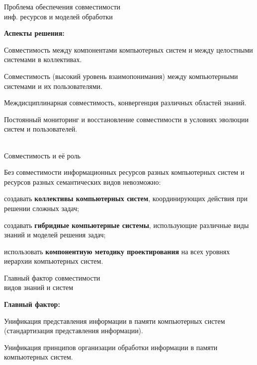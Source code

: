 \begin{frame}{Проблема обеспечения совместимости\\инф. ресурсов и моделей обработки}
	\topline
	\justifying
	
	\textbf{Аспекты решения:}
	\begin{textitemize}
		\item Совместимость между компонентами компьютерных систем и между целостными системами в коллективах.
		\item Совместимость (высокий уровень взаимопонимания) между компьютерными системами и их пользователями.
		\item Междисциплинарная совместимость, конвергенция различных областей знаний.
		\item Постоянный мониторинг и восстановление совместимости в условиях эволюции систем и пользователей.
	\end{textitemize}
	
\end{frame}


\begin{frame}{\\Совместимость и её роль}
	\topline
	\justifying
	
	Без совместимости информационных ресурсов разных компьютерных систем и ресурсов разных семантических видов невозможно:
	\begin{textitemize}
		\item создавать \textbf{коллективы компьютерных систем}, координирующих действия при решении сложных задач;
		\item создавать \textbf{гибридные компьютерные системы}, использующие различные виды знаний и моделей решения задач;
		\item использовать \textbf{компонентную методику проектирования} на всех уровнях иерархии компьютерных систем.
	\end{textitemize}
	
\end{frame}


\begin{frame}{Главный фактор совместимости\\видов знаний и систем}
	\topline
	\justifying
	
	\textbf{Главный фактор:}
	\begin{textitemize}
		\item Унификация представления информации в памяти компьютерных систем\\
		(стандартизация представления информации).
		\item Унификация принципов организации обработки информации в памяти компьютерных систем.
	\end{textitemize}
	
\end{frame}


